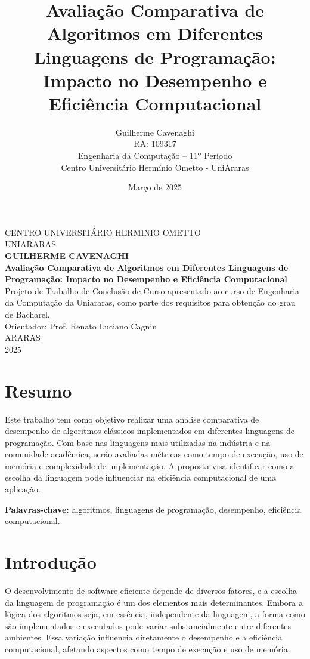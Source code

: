 \documentclass[12pt,oneside,a4paper]{report}
\title{\textbf{Avaliação Comparativa de Algoritmos em Diferentes Linguagens de Programação: Impacto no Desempenho e Eficiência Computacional}}
\author{Guilherme Cavenaghi \\ RA: 109317 \\ Engenharia da Computação -- 11º Período \\ Centro Universitário Hermínio Ometto - UniAraras}
\date{Março de 2025}
\begin{document}
\begin{titlepage}
    \begin{center}
        \large
        CENTRO UNIVERSITÁRIO HERMINIO OMETTO\\
        UNIARARAS\\[1.5cm]

        \textbf{GUILHERME CAVENAGHI}\\[5cm]

        \textbf{\Large Avaliação Comparativa de Algoritmos em Diferentes Linguagens de Programação: Impacto no Desempenho e Eficiência Computacional}\\[1.5cm]

        Projeto de Trabalho de Conclusão de Curso apresentado ao curso de Engenharia da Computação da Uniararas, como parte dos requisitos para obtenção do grau de Bacharel.\\[0.5cm]

        Orientador: Prof. Renato Luciano Cagnin\\[3cm]

        ARARAS\\
        2025
    \end{center}
\end{titlepage}

\chapter*{Resumo}
Este trabalho tem como objetivo realizar uma análise comparativa de desempenho de algoritmos clássicos implementados em diferentes linguagens de programação. Com base nas linguagens mais utilizadas na indústria e na comunidade acadêmica, serão avaliadas métricas como tempo de execução, uso de memória e complexidade de implementação. A proposta visa identificar como a escolha da linguagem pode influenciar na eficiência computacional de uma aplicação.

\textbf{Palavras-chave:} algoritmos, linguagens de programação, desempenho, eficiência computacional.


\chapter{Introdução}

O desenvolvimento de software eficiente depende de diversos fatores, e a escolha da linguagem de programação é um dos elementos mais determinantes. Embora a lógica dos algoritmos seja, em essência, independente da linguagem, a forma como são implementados e executados pode variar substancialmente entre diferentes ambientes. Essa variação influencia diretamente o desempenho e a eficiência computacional, afetando aspectos como tempo de execução e uso de memória.
\end{document}
